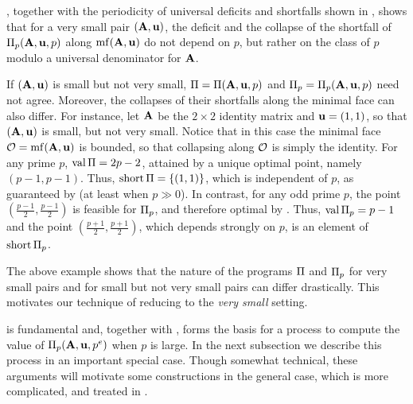 \documentclass{article}
\begin{document}
\begin{remark} \label{program behavior small: R}
   , together with the periodicity of universal deficits and shortfalls shown in , shows that for a very small pair $(\mathbf{A},\mathbf{u})$, the deficit and the collapse of the shortfall of  $\Pi_p(\mathbf{A},\mathbf{u},p)$ along $\operatorname{mf}(\mathbf{A}, \mathbf{u})$ do not depend on $p$,  but rather on the class of $p$ modulo a universal denominator for $\mathbf{A}$.
\end{remark}

\begin{example}
   If $(\mathbf{A}, \mathbf{u})$ is small but not very small, $\Pi = \Pi(\mathbf{A},\mathbf{u},p)$ and $\Pi_p = \Pi_p(\mathbf{A},\mathbf{u},p)$ need not agree.
   Moreover, the collapses of their shortfalls along the minimal face can also differ.
   For instance, let $\mathbf{A}$ be the $2 \times 2$ identity matrix and $\mathbf{u} = (1,1)$, so that $(\mathbf{A},\mathbf{u})$ is small, but not very small.
   Notice that in this case the minimal face $\mathcal{O} = \operatorname{mf}(\mathbf{A},\mathbf{u})$ is bounded, so that collapsing along $\mathcal{O}$ is simply the identity.
   For any prime $p$, $\operatorname{val} \Pi = 2p - 2$, attained by a unique optimal point, namely $(p-1,p-1)$.
   Thus, $\operatorname{short} \Pi = \{(1,1)\}$, which is independent of $p$, as guaranteed by   (at least when $p \gg 0$).
   In contrast, for any odd prime $p$, the point $(\frac{p-1}{2}, \frac{p-1}{2})$ is feasible for $\Pi_p$, and therefore optimal by .
   Thus, $\operatorname{val} \Pi_p = p-1$ and the point $(\frac{p+1}{2}, \frac{p+1}{2})$, which depends strongly on $p$, is an element of $\operatorname{short} \Pi_p$.
\end{example}

The above example shows that the nature of the programs $\Pi$ and $\Pi_p$ for very small pairs and for small but not very small pairs can differ drastically.
This motivates our technique of reducing to the \emph{very small} setting.

 is fundamental and, together with , forms the basis for a process to compute the value of $\Pi_p(\mathbf{A}, \mathbf{u}, p^e)$ when $p$ is large.  
In the next subsection we describe this process in an important special case.  Though somewhat technical, these arguments will motivate some constructions in the general case, which is more complicated, and treated in .
\end{document}
